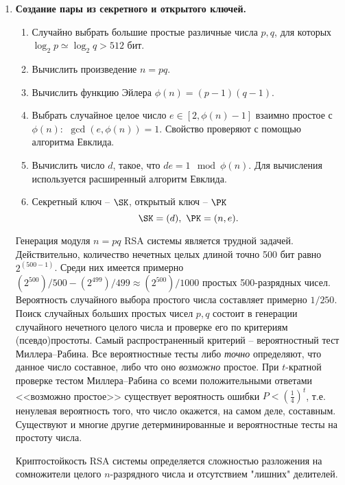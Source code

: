 \begin{enumerate}
    \item \textbf{Создание пары из секретного и открытого ключей.}
        \begin{enumerate}
            \item Случайно выбрать большие простые различные числа $p,q$, для которых $\log_2 p \simeq \log_2 q > 512$ бит.
            \item Вычислить произведение $n = pq$.
            \item Вычислить функцию Эйлера $\phi(n) = (p-1)(q-1)$.
            \item Выбрать случайное целое число $e \in [2, \phi(n)-1]$ взаимно простое с $\phi(n)$: $~ \gcd(e, \phi(n)) = 1$. Свойство проверяют с помощью алгоритма Евклида.
            \item Вычислить число $d$, такое, что  $d e= 1 \mod \phi(n)$. Для вычисления используется расширенный алгоритм Евклида.
            \item Секретный ключ -- $\SK$, открытый ключ -- $\PK$
                \[ \SK = (d), ~ \PK = (n, e). \]

        \end{enumerate}

Генерация модуля $n = pq$ RSA системы является трудной задачей. Действительно, количество нечетных целых длиной точно 500 бит равно $2^{(500-1)}$. Среди них имеется примерно
$(2^{500})/500 - (2^{499})/499 \approx (2^{500})/1000$ простых 500-разрядных чисел. Вероятность случайного выбора простого числа составляет примерно $1/250 $.
Поиск случайных больших простых чисел $p,q$ состоит в  генерации случайного нечетного целого числа и проверке его по критериям (псевдо)простоты. Самый распространенный критерий -- вероятностный тест Миллера--Рабина. Все вероятностные тесты либо \emph{точно} определяют, что данное  число  составное, либо что оно \emph{возможно} простое. При $t$-кратной проверке тестом Миллера--Рабина со всеми положительными ответами <<возможно простое>> существует вероятность ошибки $P < \left( \frac{1}{4} \right)^t$, т.е. ненулевая вероятность того, что число окажется, на самом деле, составным. Существуют и многие другие детерминированные и вероятностные тесты на простоту числа.

Криптостойкость RSA системы определяется сложностью разложения на сомножители целого $n$-разрядного числа и отсутствием "лишних" делителей.


\end{enumerate}
